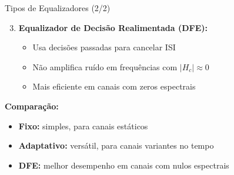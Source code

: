 
\begin{frame}{Tipos de Equalizadores (2/2)}

\begin{enumerate}
\setcounter{enumi}{2}
\item \textbf{Equalizador de Decisão Realimentada (DFE):}
   \begin{itemize}
   \item Usa decisões passadas para cancelar ISI
   \item Não amplifica ruído em frequências com $|H_c| \approx 0$
   \item Mais eficiente em canais com zeros espectrais
   \end{itemize}
\end{enumerate}

\vspace{0.2cm}

\textbf{Comparação:}
\begin{itemize}
\item \textbf{Fixo:} simples, para canais estáticos
\item \textbf{Adaptativo:} versátil, para canais variantes no tempo
\item \textbf{DFE:} melhor desempenho em canais com nulos espectrais
\end{itemize}

\end{frame}




